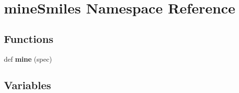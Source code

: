 \hypertarget{namespacemineSmiles}{}\section{mine\+Smiles Namespace Reference}
\label{namespacemineSmiles}
\subsection*{Functions}
\begin{DoxyCompactItemize}
\item 
\mbox{\label{namespacemineSmiles_abc9fb406999d9ac11ba1e06b1094cb94}} 
def {\bfseries mine} (spec)
\end{DoxyCompactItemize}
\subsection*{Variables}
